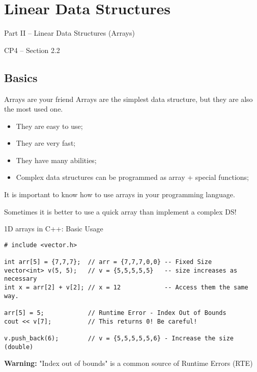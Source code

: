 \section{Linear Data Structures}

\begin{frame}
  \begin{center}
    {\large
    Part II -- Linear Data Structures (Arrays)\bigskip

    CP4 -- Section 2.2
    }
  \end{center}
\end{frame}

\subsection{Basics}

\begin{frame}{Arrays are your friend}
  Arrays are the simplest data structure, but they are also the most used one.\bigskip

  \begin{itemize}
    \item They are easy to use;
    \item They are very fast;
    \item They have many abilities;
    \item Complex data structures can be programmed as array + special functions;
  \end{itemize}\bigskip

  It is important to know how to use arrays in your programming language.\medskip

  \begin{block}{}
    Sometimes it is better to use a quick array than implement a complex DS!
  \end{block}
\end{frame}


\begin{frame}[fragile]{1D arrays in C++: Basic Usage}

  {\small
\begin{verbatim}
# include <vector.h>

int arr[5] = {7,7,7};  // arr = {7,7,7,0,0} -- Fixed Size
vector<int> v(5, 5);   // v = {5,5,5,5,5}   -- size increases as necessary
int x = arr[2] + v[2]; // x = 12            -- Access them the same way.

arr[5] = 5;            // Runtime Error - Index Out of Bounds
cout << v[7];          // This returns 0! Be careful!

v.push_back(6);        // v = {5,5,5,5,5,6} - Increase the size (double)
\end{verbatim}
  }

  \begin{alertblock}{}
    \alert{\bf Warning:} "Index out of bounds" is a  common source of Runtime Errors (RTE)
  \end{alertblock}

\end{frame}

